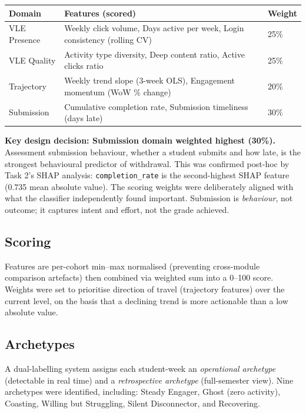 \documentclass[10pt,a4paper]{article}
\begin{document}
\begin{center}
\small
\begin{tabularx}{\linewidth}{@{}lLl@{}}
\toprule
\textbf{Domain} & \textbf{Features (scored)} & \textbf{Weight} \\
\midrule
VLE Presence  & Weekly click volume, Days active per week, Login consistency (rolling CV) & 25\% \\
VLE Quality   & Activity type diversity, Deep content ratio, Active clicks ratio & 25\% \\
Trajectory    & Weekly trend slope (3-week OLS), Engagement momentum (WoW \% change) & 20\% \\
Submission    & Cumulative completion rate, Submission timeliness (days late) & 30\% \\
\bottomrule
\end{tabularx}
\end{center}

\textbf{Key design decision: Submission domain weighted highest (30\%).}
Assessment submission behaviour, whether a student submits and how late, is the strongest
behavioural predictor of withdrawal. This was confirmed post-hoc by Task 2's SHAP analysis:
\texttt{completion\_rate} is the second-highest SHAP feature (0.735 mean absolute value).
The scoring weights were deliberately aligned with what the classifier independently found
important. Submission is \emph{behaviour}, not outcome; it captures intent and effort, not
the grade achieved.

\subsection{Scoring} Features are per-cohort min–max normalised (preventing cross-module
comparison artefacts) then combined via weighted sum into a 0–100 score. Weights were set
to prioritise direction of travel (trajectory features) over the current level, on the basis
that a declining trend is more actionable than a low absolute value.

\subsection{Archetypes} A dual-labelling system assigns each student-week an
\emph{operational archetype} (detectable in real time) and a \emph{retrospective archetype}
(full-semester view). Nine archetypes were identified, including: Steady Engager, Ghost
(zero activity), Coasting, Willing but Struggling, Silent Disconnector, and Recovering.
\end{document}
